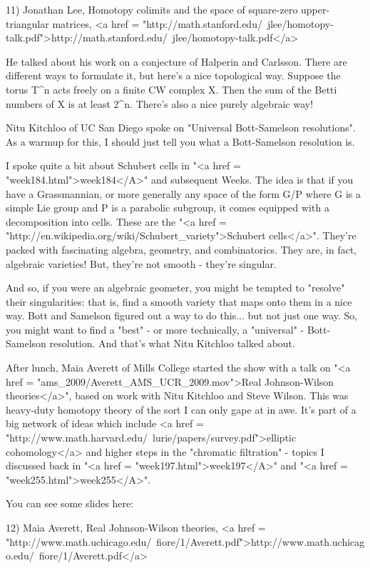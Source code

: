 11) Jonathan Lee, Homotopy colimits and the space of square-zero
upper-triangular matrices,
<a href = "http://math.stanford.edu/~jlee/homotopy-talk.pdf">http://math.stanford.edu/~jlee/homotopy-talk.pdf</a>

He talked about his work on a conjecture of Halperin and Carlsson.
There are different ways to formulate it, but here's a nice
topological way.  Suppose the torus T^{n} acts freely on a finite CW
complex X.  Then the sum of the Betti numbers of X is at least
2^{n}.  There's also a nice purely algebraic way!  

Nitu Kitchloo of UC San Diego spoke on "Universal Bott-Samelson 
resolutions".  As a warmup for this, I should just tell you what
a Bott-Samelson resolution is.

I spoke quite a bit about Schubert cells in "<a href =
"week184.html">week184</A>" and subsequent Weeks.  The idea is
that if you have a Grassmannian, or more generally any space of the
form G/P where G is a simple Lie group and P is a parabolic subgroup,
it comes equipped with a decomposition into cells.  These are the
"<a href =
"http://en.wikipedia.org/wiki/Schubert_variety">Schubert
cells</a>".  They're packed with fascinating algebra, geometry,
and combinatorics.  They are, in fact, algebraic varieties!  But,
they're not smooth - they're singular.

And so, if you were an algebraic geometer, you might be tempted to
"resolve" their singularities: that is, find a smooth
variety that maps onto them in a nice way.  Bott and Samelson figured
out a way to do this... but not just one way.  So, you might want to
find a "best" - or more technically, a "universal"
- Bott-Samelson resolution.  And that's what Nitu Kitchloo talked
about.

After lunch, Maia Averett of Mills College started the show with a
talk on "<a href = "ams_2009/Averett_AMS_UCR_2009.mov">Real
Johnson-Wilson theories</a>", based on work with Nitu Kitchloo
and Steve Wilson.  This was heavy-duty homotopy theory of the sort I
can only gape at in awe.  It's part of a big network of ideas which
include <a href =
"http://www.math.harvard.edu/~lurie/papers/survey.pdf">elliptic
cohomology</a> and higher steps in the "chromatic
filtration" - topics I discussed back in "<a href =
"week197.html">week197</A>" and "<a href =
"week255.html">week255</A>".

You can see some slides here:

12) Maia Averett, Real Johnson-Wilson theories, 
<a href = "http://www.math.uchicago.edu/~fiore/1/Averett.pdf">http://www.math.uchicago.edu/~fiore/1/Averett.pdf</a>

